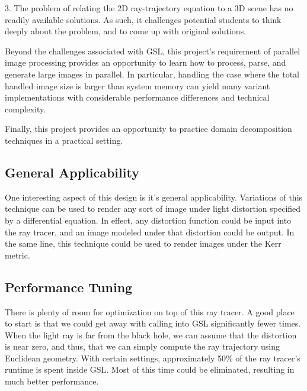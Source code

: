3. The problem of relating the 2D ray-trajectory equation to a 3D scene has no readily available solutions. As such, it challenges potential students to think deeply about the problem, and to come up with original solutions.

Beyond the challenges associated with GSL, this project's requirement of parallel image processing provides an opportunity to learn how to process, parse, and generate large images in parallel. In particular, handling the case where the total handled image size is larger than system memory can yield many variant implementations with considerable performance differences and technical complexity. 

Finally, this project provides an opportunity to practice domain decomposition techniques in a practical setting. %


\subsection{General Applicability}
One interesting aspect of this design is it's general applicability. Variations of this technique can be used to render any sort of image under light distortion specified by a differential equation. In effect, any distortion function could be input into the ray tracer, and an image modeled under that distortion could be output. In the same line, this technique could be used to render images under the Kerr metric.


\subsection{Performance Tuning}
There is plenty of room for optimization on top of this ray tracer. A good place to start is that we could get away with calling into GSL significantly fewer times. When the light ray is far from the black hole, we can assume that the distortion is near zero, and thus, that we can simply compute the ray trajectory using Euclidean geometry. With certain settings, approximately 50\% of the ray tracer's runtime is spent inside GSL. Most of this time could be eliminated, resulting in much better performance. 




